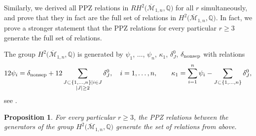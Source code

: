 \documentclass[10pt,a4paper]{amsart}
\def\oM{\overline{\mathcal{M}}}
\numberwithin{equation}{section}
\newtheorem{Proposition}[Theorem]{Proposition}
 { \theoremstyle{definition}
\newtheorem{Definition}[Theorem]{Definition}
\newtheorem{Note}[Theorem]{Note}
\newtheorem{Example}[Theorem]{Example}
\newtheorem{Remark}[Theorem]{Remark} }
\begin{document}
Similarly, we derived all PPZ relations in $RH^2\big(\oM_{1,n},\mathbb{Q}\big)$ for all $r$ simultaneously, and prove that they in fact are the full set of relations in $H^2\big(\oM_{1,n},\mathbb{Q}\big)$. In fact, we prove a stronger statement that the PPZ relations for every particular $r\geq3$ generate the full set of relations.

The group $H^2\big(\oM_{1,n},\mathbb{Q}\big)$ is generated by
$\psi_1$, $\dots$, $\psi_n$, $\kappa_1$, $\delta^{0}_{J}$, $\delta_{\rm nonsep}$ with relations
\begin{gather}
12\psi_i = \delta_{\rm nonsep} + 12\sum_{\substack{J\subset \{1,\dots,n\}|i\in J \\ |J|\geq 2}} \delta^{0}_{J}, \quad i=1,\dots,n,\qquad
 \kappa_1 = \sum^{n}_{i=1}\psi_i - \sum_{J\subset \{1,\dots,n\}}\delta^{0}_{J},\label{genus1}
\end{gather}
see \cite[Theorem 2.2]{Cor}.


\begin{Proposition}
For every particular $r\geq3$, the PPZ relations between the generators of the group $H^2\big(\oM_{1,n},\mathbb{Q}\big)$ generate the set of relations from above.
\end{Proposition}
\end{document}
